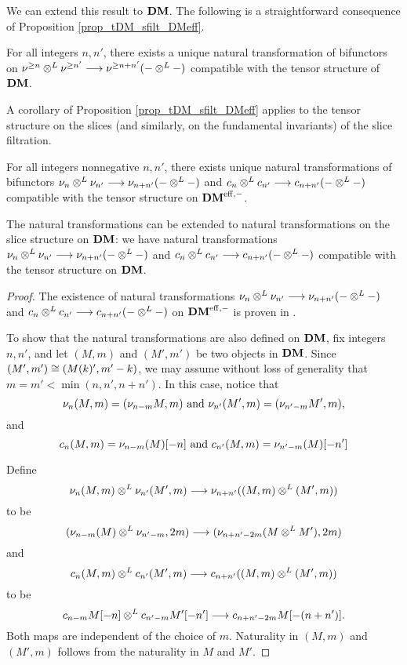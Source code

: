 We can extend this result to $\DM$. The following is a
straightforward consequence of Proposition 
\ref{prop_tDM_sfilt_DMeff}.

\begin{cor}\label{cor_tDM_sfilt_DM}
For all integers $n, n'$, there exists a unique natural 
transformation of bifunctors on $\sgDM{n} \tDM \sgDM{n'} \to 
\sgDM{n + n'}(- \tDM -)$ compatible with the tensor structure of 
$\DM$.
\end{cor}

A corollary of Proposition \ref{prop_tDM_sfilt_DMeff} applies to 
the tensor structure on the slices (and similarly, on the 
fundamental invariants) of the slice filtration.

\begin{cor}
For all integers nonnegative $n, n'$, there exists unique
natural transformations of bifunctors $\sliceDM{n} \tDM 
\sliceDM{n'} \to \sliceDM{n + n'}(- \tDM -)$ and $\fIDM{n} \tDM
\fIDM{n'} \to \fIDM{n + n'}(- \tDM -)$ compatible with the tensor 
structure on $\DMeff$.

The natural transformations can be extended to natural 
transformations on the slice structure on $\DM$: we have natural 
transformations $\sliceDM{n} \tDM \sliceDM{n'} \to 
\sliceDM{n + n'}(- \tDM -)$ and $\fIDM{n} \tDM \fIDM{n'} \to 
\fIDM{n + n'}(- \tDM -)$ compatible with the tensor structure on 
$\DM$.
\end{cor}
\begin{proof}
The existence of natural transformations $\sliceDM{n} \tDM 
\sliceDM{n'} \to \sliceDM{n + n'}(- \tDM -)$ and $\fIDM{n} \tDM 
\fIDM{n'} \to \fIDM{n + n'}(- \tDM -)$ on $\DMeff$ is proven
in \cite[1.6]{HuKa}.

To show that the natural transformations are also defined on 
$\DM$, fix integers $n, n'$, and let $(M, m)$ and $(M', m')$ be 
two objects in $\DM$. Since $(M',m') \cong (\tZ[k]M', m' - k)$, 
we may assume without loss of generality that $m = m' < 
\min(n, n', n + n')$. In this case, notice that
\[
\sliceDM{n}(M, m) = (\sliceDM{n - m}M, m) 
\textrm{ and }
\sliceDM{n'}(M', m) = (\sliceDM{n' - m}M', m),
\]
and
\[
\fIDM{n}(M, m) = \sliceDM{n - m}(M)[-n]
\textrm{ and }
\fIDM{n'}(M, m) = \sliceDM{n' - m}(M)[-n']
\]

Define
\[
\sliceDM{n}(M, m) \tDM \sliceDM{n'}(M',m)
\to \sliceDM{n + n'}((M, m) \tDM (M',m))
\]
to be
\[
(\sliceDM{n - m}(M) \tDM \sliceDM{n' - m}, 2m) \to
   (\sliceDM{n + n' - 2m}(M \tDM M'), 2m)
\]
and
\[
\fIDM{n}(M, m) \tDM \fIDM{n'}(M',m)
\to \fIDM{n + n'}((M, m) \tDM (M',m))
\]
to be
\[
\fIDM{n - m}M[-n] \tDM \fIDM{n' - m}M'[-n']
\to \fIDM{n + n' - 2m}M[-(n + n')].
\]
Both maps are independent of the choice of $m$. Naturality in 
$(M, m)$ and $(M', m)$ follows from the naturality in $M$ and 
$M'$.
\end{proof}

